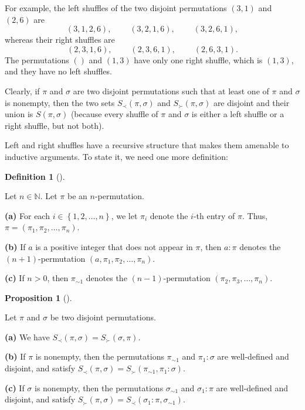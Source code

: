 \documentclass[numbers=enddot,12pt,final,onecolumn,notitlepage]{scrartcl}%
\theoremstyle{definition}
\newtheorem{prop}[theo]{Proposition}
\newenvironment{proposition}[1][]
{\begin{prop}[#1]\begin{leftbar}}
{\end{leftbar}\end{prop}}
\newtheorem{defi}[theo]{Definition}
\newenvironment{definition}[1][]
{\begin{defi}[#1]\begin{leftbar}}
{\end{leftbar}\end{defi}}
\begin{document}
For example, the left shuffles of the two disjoint permutations $\left(
3,1\right)  $ and $\left(  2,6\right)  $ are%
\[
\left(  3,1,2,6\right)  ,\ \ \ \ \ \ \ \ \ \ \left(  3,2,1,6\right)
,\ \ \ \ \ \ \ \ \ \ \left(  3,2,6,1\right)  ,
\]
whereas their right shuffles are%
\[
\left(  2,3,1,6\right)  ,\ \ \ \ \ \ \ \ \ \ \left(  2,3,6,1\right)
,\ \ \ \ \ \ \ \ \ \ \left(  2,6,3,1\right)  .
\]
The permutations $\left(  {}\right)  $ and $\left(  1,3\right)  $ have only
one right shuffle, which is $\left(  1,3\right)  $, and they have no left shuffles.

Clearly, if $\pi$ and $\sigma$ are two disjoint permutations such that at
least one of $\pi$ and $\sigma$ is nonempty, then the two sets $S_{\prec
}\left(  \pi,\sigma\right)  $ and $S_{\succ}\left(  \pi,\sigma\right)  $ are
disjoint and their union is $S\left(  \pi,\sigma\right)  $ (because every
shuffle of $\pi$ and $\sigma$ is either a left shuffle or a right shuffle, but
not both).

Left and right shuffles have a recursive structure that makes them amenable to
inductive arguments. To state it, we need one more definition:

\begin{definition}
\label{def.LR.pi1}Let $n\in\mathbb{N}$. Let $\pi$ be an $n$-permutation.

\textbf{(a)} For each $i\in\left\{  1,2,\ldots,n\right\}  $, we let $\pi_{i}$
denote the $i$-th entry of $\pi$. Thus, $\pi=\left(  \pi_{1},\pi_{2}%
,\ldots,\pi_{n}\right)  $.

\textbf{(b)} If $a$ is a positive integer that does not appear in $\pi$, then
$a:\pi$ denotes the $\left(  n+1\right)  $-permutation $\left(  a,\pi_{1}%
,\pi_{2},\ldots,\pi_{n}\right)  $.

\textbf{(c)} If $n>0$, then $\pi_{\sim1}$ denotes the $\left(  n-1\right)
$-permutation $\left(  \pi_{2},\pi_{3},\ldots,\pi_{n}\right)  $.
\end{definition}

\begin{proposition}
\label{prop.LR.rec}Let $\pi$ and $\sigma$ be two disjoint permutations.

\textbf{(a)} We have $S_{\prec}\left(  \pi,\sigma\right)  =S_{\succ}\left(
\sigma,\pi\right)  $.

\textbf{(b)} If $\pi$ is nonempty, then the permutations $\pi_{\sim1}$ and
$\pi_{1}:\sigma$ are well-defined and disjoint, and satisfy $S_{\prec}\left(
\pi,\sigma\right)  =S_{\succ}\left(  \pi_{\sim1},\pi_{1}:\sigma\right)  $.

\textbf{(c)} If $\sigma$ is nonempty, then the permutations $\sigma_{\sim1}$
and $\sigma_{1}:\pi$ are well-defined and disjoint, and satisfy $S_{\succ
}\left(  \pi,\sigma\right)  =S_{\prec}\left(  \sigma_{1}:\pi,\sigma_{\sim
1}\right)  $.
\end{proposition}
\end{document}
